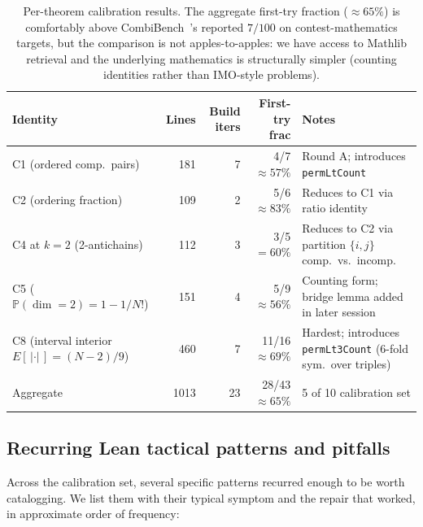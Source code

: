 \documentclass[11pt]{article}
\theoremstyle{definition}
\begin{document}
\begin{table}[h]
\centering
\begin{tabular}{lrrrl}
\hline
Identity & Lines & Build iters & First-try frac & Notes \\
\hline
C1 (ordered comp.\ pairs) & 181 & 7 & 4/7 $\approx 57\%$ & Round A; introduces \texttt{permLtCount} \\
C2 (ordering fraction)    & 109 & 2 & 5/6 $\approx 83\%$ & Reduces to C1 via ratio identity \\
C4 at $k{=}2$ (2-antichains) & 112 & 3 & 3/5 $= 60\%$ & Reduces to C2 via partition $\{i,j\}$ comp.\ vs.\ incomp. \\
C5 ($\mathbb{P}(\dim{=}2) = 1{-}1/N!$) & 151 & 4 & 5/9 $\approx 56\%$ & Counting form; bridge lemma added in later session \\
C8 (interval interior $E[\,|\cdot|\,] = (N{-}2)/9$) & 460 & 7 & 11/16 $\approx 69\%$ & Hardest; introduces \texttt{permLt3Count} (6-fold sym.\ over triples) \\
\hline
Aggregate                 & 1013 & 23 & 28/43 $\approx 65\%$ & 5 of 10 calibration set \\
\hline
\end{tabular}
\caption{Per-theorem calibration results. The aggregate first-try fraction
($\approx 65\%$) is comfortably above CombiBench~\cite{combibench}'s reported
$7/100$ on contest-mathematics targets, but the comparison is not apples-to-apples:
we have access to Mathlib retrieval and the underlying mathematics is structurally
simpler (counting identities rather than IMO-style problems).}
\label{tab:per-theorem}
\end{table}

\subsection{Recurring Lean tactical patterns and pitfalls}

Across the calibration set, several specific patterns recurred enough to be worth
catalogging. We list them with their typical symptom and the repair that worked,
in approximate order of frequency:
\end{document}
